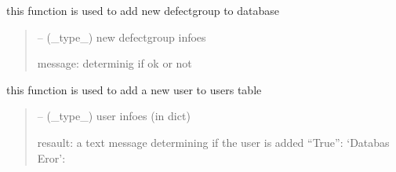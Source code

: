 \documentclass[letterpaper,10pt,english]{sphinxmanual}
\begin{document}
\begin{savenotes}
\begin{fulllineitems}
\begin{savenotes}\begin{fulllineitems}
\label{\detokenize{setting/database_utils:oxin.database_utils.dataBaseUtils.add_defect_group}}
\pysigstartsignatures
{}
\pysigstopsignatures
\sphinxAtStartPar
this function is used to add new defect\sphinxhyphen{}group to database
\begin{quote}\begin{description}
\sphinxAtStartPar
{} – (\_type\_) new defect\sphinxhyphen{}group infoes

\sphinxAtStartPar
message: determinig if ok or not

\end{description}\end{quote}

\end{fulllineitems}\end{savenotes}


\begin{savenotes}\begin{fulllineitems}
\label{\detokenize{setting/database_utils:oxin.database_utils.dataBaseUtils.add_user}}
\pysigstartsignatures
{}
\pysigstopsignatures
\sphinxAtStartPar
this function is used to add a new user to users table
\begin{quote}\begin{description}
\sphinxAtStartPar
{} – (\_type\_) user infoes (in dict)

\sphinxAtStartPar
resault: a text message determining if the user is added
“True”:
‘Databas Eror’:

\end{description}\end{quote}

\end{fulllineitems}\end{savenotes}



\end{fulllineitems}
\end{savenotes}
\end{document}
